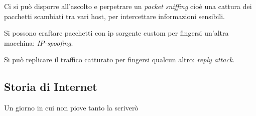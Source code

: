 Ci si può disporre all'ascolto e perpetrare un \emph{packet sniffing} cioè una cattura dei pacchetti scambiati tra vari host, per intercettare informazioni sensibili.

Si possono craftare pacchetti con ip sorgente custom per fingersi un'altra macchina: \emph{IP-spoofing}.

Si può replicare il traffico catturato per fingersi qualcun altro: \emph{reply attack}.

\subsection{Storia di Internet}
Un giorno in cui non piove tanto la scriverò